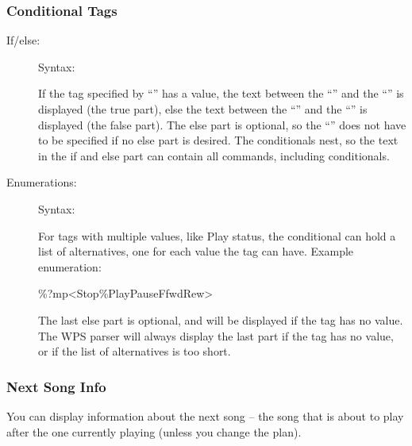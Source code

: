 
\subsubsection{Conditional Tags}

\begin{description}
\item[If/else: ]
Syntax: 

If the tag specified by ``'' has a value, the text between the 
``\config{{\textless}}'' and the ``\config{{\textbar}}'' is displayed (the true
part), else the text between the ``\config{{\textbar}}'' and the 
``\config{{\textgreater}}'' is displayed (the false part).
The else part is optional, so the ``\config{{\textbar}}'' does not have to be 
specified if no else part is desired. The conditionals nest, so the text in the
if and else part can contain all \config{\%} commands, including conditionals.

\item[Enumerations: ]
Syntax: 

For tags with multiple values, like Play status, the conditional can hold a 
list of alternatives, one for each value the tag can have.
Example enumeration: 
\begin{example}
     \%?mp{\textless}Stop{\textbar}\%Play{\textbar}Pause{\textbar}Ffwd{\textbar}Rew{\textgreater}
\end{example}

The last else part is optional, and will be displayed if the tag has no value. 
The WPS parser will always display the last part if the tag has no value, or if
the list of alternatives is too short.
\end{description}

\subsubsection{Next Song Info}
You can display information about the next song -- the song that is
about to play after the one currently playing (unless you change the
plan).

